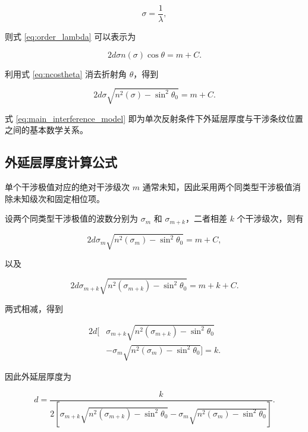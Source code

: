 \documentclass[UTF8,12pt,a4paper]{ctexart}
\begin{document}
\begin{equation}
    \sigma=\frac{1}{\lambda},
\end{equation}

则式 \eqref{eq:order_lambda} 可以表示为

\begin{equation}
    2d\sigma n(\sigma)\cos\theta
    =
    m+C.
    \label{eq:order_sigma}
\end{equation}

利用式 \eqref{eq:ncostheta} 消去折射角 $\theta$，得到

\begin{equation}
    \boxed{
    2d\sigma
    \sqrt{
    n^2(\sigma)-\sin^2\theta_0
    }
    =
    m+C
    }.
    \label{eq:main_interference_model}
\end{equation}

式 \eqref{eq:main_interference_model} 即为单次反射条件下外延层厚度与干涉条纹位置之间的基本数学关系。

\subsection{外延层厚度计算公式}

单个干涉极值对应的绝对干涉级次 $m$ 通常未知，因此采用两个同类型干涉极值消除未知级次和固定相位项。

设两个同类型干涉极值的波数分别为 $\sigma_m$ 和 $\sigma_{m+k}$，二者相差 $k$ 个干涉级次，则有

\begin{equation}
    2d\sigma_m
    \sqrt{
    n^2(\sigma_m)-\sin^2\theta_0
    }
    =
    m+C,
\end{equation}

以及

\begin{equation}
    2d\sigma_{m+k}
    \sqrt{
    n^2(\sigma_{m+k})-\sin^2\theta_0
    }
    =
    m+k+C.
\end{equation}

两式相减，得到

\begin{align}
    2d
    \Big[
    &\sigma_{m+k}
    \sqrt{
    n^2(\sigma_{m+k})-\sin^2\theta_0
    }
    \nonumber\\
    &-
    \sigma_m
    \sqrt{
    n^2(\sigma_m)-\sin^2\theta_0
    }
    \Big]
    =
    k.
\end{align}

因此外延层厚度为

\begin{equation}
    \boxed{
    d
    =
    \frac{k}{
    2\left[
    \sigma_{m+k}
    \sqrt{
    n^2(\sigma_{m+k})-\sin^2\theta_0
    }
    -
    \sigma_m
    \sqrt{
    n^2(\sigma_m)-\sin^2\theta_0
    }
    \right]
    }
    }.
    \label{eq:thickness_general}
\end{equation}
\end{document}

